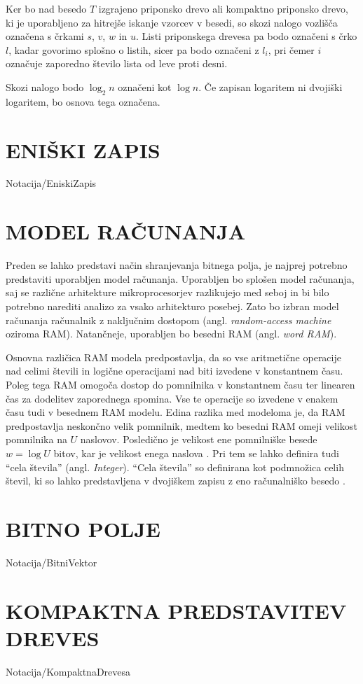 Ker bo nad besedo $T$ izgrajeno priponsko drevo ali kompaktno priponsko drevo, ki je uporabljeno za hitrejše iskanje vzorcev v besedi, so skozi nalogo vozlišča označena s črkami $s$, $v$, $w$ in $u$. Listi priponskega drevesa pa bodo označeni s črko $l$, kadar govorimo splošno o listih, sicer pa bodo označeni z $l_i$, pri čemer $i$ označuje zaporedno število lista od leve proti desni.

Skozi nalogo bodo $\log_2{n}$ označeni kot $\log{n}$. Če zapisan logaritem ni dvojiški logaritem, bo osnova tega označena.


\section{ENIŠKI ZAPIS}\label{sec:Eniski_Zapis}
{Notacija/EniskiZapis}

\section{MODEL RAČUNANJA}\label{sec:Model_racunanja}
Preden se lahko predstavi način shranjevanja bitnega polja, je najprej potrebno predstaviti uporabljen model računanja. Uporabljen bo splošen model računanja, saj se različne arhitekture mikroprocesorjev razlikujejo med seboj in bi bilo potrebno narediti analizo za vsako arhitekturo posebej. Zato bo izbran model računanja računalnik z naključnim dostopom (angl. \textit{random-access machine} oziroma RAM). Natančneje, uporabljen bo besedni RAM (angl. \textit{word RAM}).

Osnovna različica RAM modela predpostavlja, da so vse aritmetične operacije nad celimi števili in logične operacijami nad biti izvedene v konstantnem času. Poleg tega RAM omogoča dostop do pomnilnika v konstantnem času ter linearen čas za dodelitev zaporednega spomina. Vse te operacije so izvedene v enakem času tudi v besednem RAM modelu. Edina razlika med modeloma je, da RAM predpostavlja neskončno velik pomnilnik, medtem ko besedni RAM omeji velikost pomnilnika na $U$ naslovov. Posledično je velikost ene pomnilniške besede $w=\log{U}$ bitov, kar je velikost enega naslova \cite{Fredman1990,Morin2013,Navarro2016}. Pri tem se lahko definira tudi \enquote{cela števila} (angl. \textit{Integer}). \enquote{Cela števila} so definirana kot podmnožica celih števil, ki so lahko predstavljena v dvojiškem zapisu z eno računalniško besedo \cite{Navarro2016}.

\section{BITNO POLJE}\label{sec:Bitno_Polje}
{Notacija/BitniVektor}


\section{KOMPAKTNA PREDSTAVITEV DREVES}\label{sec:kompaktna_drevesa}
{Notacija/KompaktnaDrevesa}